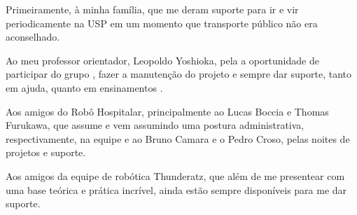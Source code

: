 \documentclass[]{politex}
\begin{document}
\capa
\falsafolhaderosto
\folhaderosto





\begin{agradecimentos}

Primeiramente, à minha família, que me deram suporte para ir e vir periodicamente na USP em um momento que transporte público não era aconselhado.

Ao meu professor orientador, Leopoldo Yoshioka, pela a oportunidade de participar do grupo , fazer a manutenção do projeto e sempre dar suporte, tanto em ajuda, quanto em ensinamentos .

Aos amigos do Robô Hospitalar, principalmente ao Lucas Boccia e Thomas Furukawa, que assume e vem assumindo uma postura administrativa, respectivamente, na equipe e ao Bruno Camara e o Pedro Croso, pelas noites de projetos e suporte. 

Aos amigos da equipe de robótica Thunderatz, que além de me presentear com uma base teórica e prática incrível, ainda estão sempre disponíveis para me dar suporte.


\end{agradecimentos}

\end{document}
